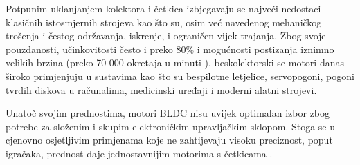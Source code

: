 \documentclass[diplomskirad]{fer}
\begin{document}
Potpunim uklanjanjem kolektora i četkica izbjegavaju se najveći nedostaci
klasičnih istosmjernih strojeva kao što su, osim već navedenog mehaničkog
trošenja i čestog održavanja, iskrenje, i ograničen vijek trajanja. Zbog svoje
pouzdanosti, učinkovitosti često i preko 80\% \cite{motor-ucinkovitost} i
mogućnosti postizanja iznimno velikih brzina (preko 70 000 okretaja u minuti
\cite{motor-rpm}), beskolektorski se motori danas široko primjenjuju u
sustavima kao što su bespilotne letjelice, servopogoni, pogoni tvrdih diskova u
računalima, medicinski uređaji i moderni alatni strojevi.

Unatoč svojim prednostima, motori BLDC nisu uvijek optimalan izbor zbog potrebe
za složenim i skupim elektroničkim upravljačkim sklopom. Stoga se u cjenovno
osjetljivim primjenama koje ne zahtijevaju visoku preciznost, poput igračaka,
prednost daje jednostavnijim motorima s četkicama \cite{HughesDrury2013}.

\newpage
\end{document}
